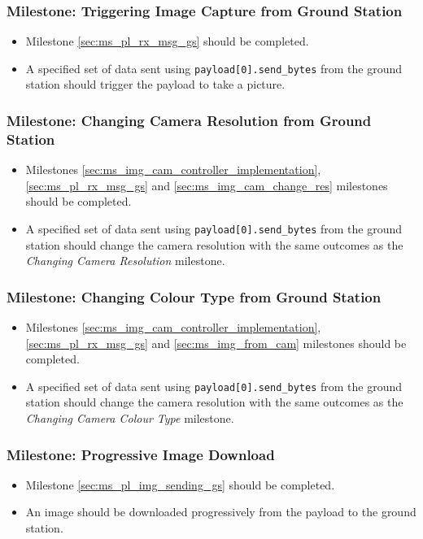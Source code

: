 	\subsubsection{Milestone: Triggering Image Capture from Ground Station}
		\label{sec:ms_pl_img_gs_trigger}
		\begin{itemize}
			\item 	Milestone \ref{sec:ms_pl_rx_msg_gs}
				should be completed.
			\item 	A specified set of data sent using \verb+payload[0].send_bytes+
				from the ground station should trigger the payload to take a picture.
		\end{itemize}

	\subsubsection{Milestone: Changing Camera Resolution from Ground Station}
		\label{sec:ms_pl_img_gs_cam_res}
		\begin{itemize}
			\item 	Milestones \ref{sec:ms_img_cam_controller_implementation}, \ref{sec:ms_pl_rx_msg_gs} and 
				\ref{sec:ms_img_cam_change_res} milestones should be completed.
			\item 	A specified set of data sent using \verb+payload[0].send_bytes+
				from the ground station should change the camera resolution with 
				the same outcomes as the \emph{Changing Camera Resolution} milestone.
		\end{itemize}


	\subsubsection{Milestone: Changing Colour Type from Ground Station}
		\label{sec:ms_pl_img_gs_cam_colour_type}
		\begin{itemize}
			\item 	Milestones \ref{sec:ms_img_cam_controller_implementation}, \ref{sec:ms_pl_rx_msg_gs} and 
				\ref{sec:ms_img_from_cam} milestones should be completed.
			\item 	A specified set of data sent using \verb+payload[0].send_bytes+
				from the ground station should change the camera resolution with 
				the same outcomes as the \emph{Changing Camera Colour Type} milestone.
		\end{itemize}

	\subsubsection{Milestone: Progressive Image Download}
		\label{sec:ms_pl_img_gs_progressive_dl}
		\begin{itemize}
			\item 	Milestone \ref{sec:ms_pl_img_sending_gs} should be completed.
			\item 	An image should be downloaded progressively from the payload to the
				ground station.
		\end{itemize}


